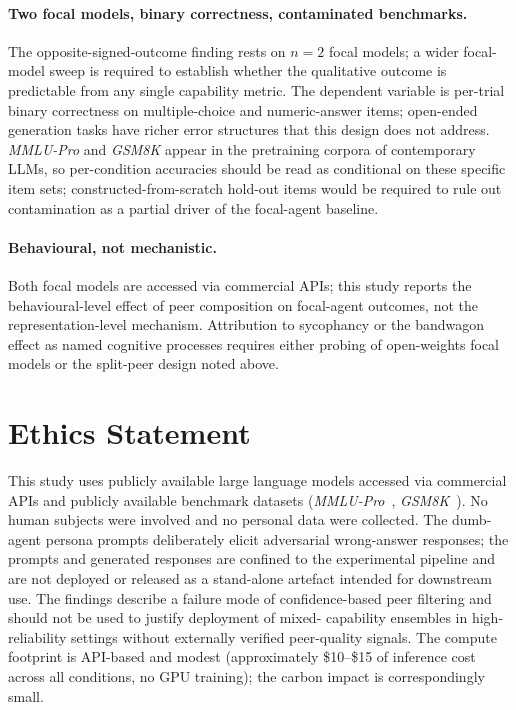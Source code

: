 \documentclass[review,3p,authoryear]{elsarticle}
\begin{document}
\paragraph{Two focal models, binary correctness, contaminated benchmarks.}
The opposite-signed-outcome finding rests on $n = 2$ focal models; a
wider focal-model sweep is required to establish whether the
qualitative outcome is predictable from any single capability metric.
The dependent variable is per-trial binary correctness on
multiple-choice and numeric-answer items; open-ended generation
tasks have richer error structures that this design does not address.
\textit{MMLU-Pro} and \textit{GSM8K} appear in the pretraining
corpora of contemporary LLMs, so per-condition accuracies should be
read as conditional on these specific item sets;
constructed-from-scratch hold-out items would be required to rule
out contamination as a partial driver of the focal-agent baseline.

\paragraph{Behavioural, not mechanistic.}
Both focal models are accessed via commercial APIs; this study
reports the behavioural-level effect of peer composition on
focal-agent outcomes, not the representation-level mechanism.
Attribution to sycophancy or the bandwagon effect as named cognitive
processes requires either probing of open-weights focal models or
the split-peer design noted above.

\section*{Ethics Statement}
\label{sec:ethics}

This study uses publicly available large language models accessed via
commercial APIs and publicly available benchmark datasets
(\textit{MMLU-Pro}~\citep{wang2024mmlupro},
\textit{GSM8K}~\citep{cobbe2021training}).
No human subjects were involved and no personal data were collected.
The dumb-agent persona prompts deliberately elicit adversarial
wrong-answer responses; the prompts and generated responses are
confined to the experimental pipeline and are not deployed or released
as a stand-alone artefact intended for downstream use.
The findings describe a failure mode of confidence-based peer
filtering and should not be used to justify deployment of mixed-
capability ensembles in high-reliability settings without externally
verified peer-quality signals.
The compute footprint is API-based and modest (approximately
\$10--\$15 of inference cost across all conditions, no GPU training);
the carbon impact is correspondingly small.
\end{document}
